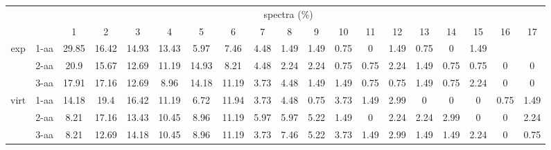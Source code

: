\documentclass{article}
\begin{document}
\begin{landscape}
\begin{table}[h]\tiny
\vspace{3mm}
{\centering
\begin{center}
\begin{tabular}{|c|l|c|c|c|c|c|c|c|c|c|c|c|c|c|c|c|c|c|}
  \hline
  \multicolumn{2}{|c|}{ } & \multicolumn{ 16 }{|c|}{ spectra (\%)} \\
  \cline{3- 19}
  \multicolumn{2}{|c|}{ }  & 1 & 2 & 3 & 4 & 5 & 6 & 7 & 8 & 9 & 10 & 11 & 12 & 13 & 14 & 15 & 16 & 17\\
  \hline
  \multirow{3}{*}{exp}
&  1-aa  & 29.85 & 16.42 & 14.93 & 13.43 & 5.97 & 7.46 & 4.48 & 1.49 & 1.49 & 0.75 & 0 & 1.49 & 0.75 & 0 & 1.49 &  & \\
&  2-aa  & 20.9 & 15.67 & 12.69 & 11.19 & 14.93 & 8.21 & 4.48 & 2.24 & 2.24 & 0.75 & 0.75 & 2.24 & 1.49 & 0.75 & 0.75 & 0 & 0\\
&  3-aa  & 17.91 & 17.16 & 12.69 & 8.96 & 14.18 & 11.19 & 3.73 & 4.48 & 1.49 & 1.49 & 0.75 & 0.75 & 1.49 & 0.75 & 2.24 & 0 & 0\\
 \hline
  \multirow{3}{*}{virt} 
&  1-aa  & 14.18 & 19.4 & 16.42 & 11.19 & 6.72 & 11.94 & 3.73 & 4.48 & 0.75 & 3.73 & 1.49 & 2.99 & 0 & 0 & 0 & 0.75 & 1.49\\
&  2-aa  & 8.21 & 17.16 & 13.43 & 10.45 & 8.96 & 11.19 & 5.97 & 5.97 & 5.22 & 1.49 & 0 & 2.24 & 2.24 & 2.99 & 0 & 0 & 2.24\\
&  3-aa  & 8.21 & 12.69 & 14.18 & 10.45 & 8.96 & 11.19 & 3.73 & 7.46 & 5.22 & 3.73 & 1.49 & 2.99 & 1.49 & 1.49 & 2.24 & 0 & 0.75\\
 \hline
\end{tabular}
\end{center}
\par}
\centering
\vspace{3mm}
\end{table}


\end{landscape}
\end{document}

